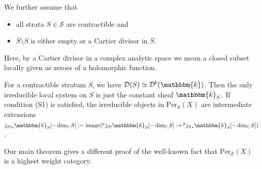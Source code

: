 \documentclass[12pt,a4paper]{amsart}
\newcommand{\dD}{{\mathcal{D}}}
\newcommand{\kk}{\mathbbm{k}}
\newcommand{\tr}{{\mbox{$t$-struc}\-tu\-r}}
\newcommand{\ol}[1]{\overline{#1}}
\theoremstyle{definition}
\begin{document}
We further assume that 
\begin{itemize}
	\item[(S1)] all strata  $S\in \mathscr{S}$ are contractible and
	\item[(S2)] $\ol{S} \setminus S$ is either empty or a Cartier divisor in $\ol{S}$.
\end{itemize}
Here, by a Cartier divisor in a complex analytic space we mean a closed subset locally given as zeroes of a holomorphic function. 

For a contractible stratum $S$, we have $\dD(S) \simeq \dD^b(\kk)$. Then the only irreducible local system on $S$ is just the constant sheaf $\kk_S$. 
If condition (S1) is satisfied, the irreducible objects in $\textrm{Per}_{\mathscr{S}}(X)$ are intermediate extensions ${j_S}_{!*}\kk_S[-\dim_{\mathbb{C}} S] := \textrm{image}({}^p{j_S}_{!}\kk_S[-\dim_{\mathbb{C}} S]\to {}^p{j_S}_{*}\kk_S[-\dim_{\mathbb{C}} S])$ \cite{BBD}.






Our main theorem gives a different proof of the well-known fact that $\textrm{Per}_{\mathscr{S}}(X)$ is a highest weight category.
\end{document}
